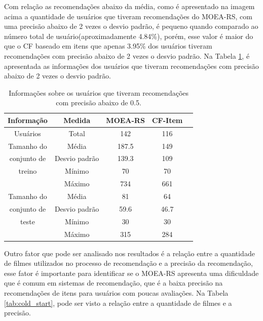 Com relação as recomendações abaixo da média, como é apresentado na imagem acima a quantidade de usuários que tiveram recomendações do MOEA-RS, com uma precisão abaixo de 2 vezes o desvio padrão, é  pequeno quando comparado ao número total de usuário(aproximadamente 4.84\%), porém, esse valor é maior do que o CF baseado em itens que apenas 3.95\% dos usuários tiveram recomendações com precisão abaixo de 2 vezes o desvio padrão.  Na Tabela \ref{tab:low_precisions}, é apresentada as informações dos usuários que tiveram recomendações com precisão abaixo de 2 vezes o desvio padrão.

\begin{table}[H]
\centering
\begin{tabular}{|c| c | c c c |}
\hline
Informação      & Medida           & MOEA-RS    & CF-Item \\ 
\hline
Usuários        & Total             & 142       & 116\\
\hline
Tamanho do      & Média             & 187.5     & 149\\
conjunto de     & Desvio padrão     & 139.3     & 109\\
treino          & Mínimo            & 70        & 70\\
                & Máximo            & 734       & 661\\
\hline
Tamanho do      & Média             & 81        & 64\\
conjunto de     & Desvio padrão     & 59.6      & 46.7\\
teste           & Mínimo            & 30        & 30\\
                & Máximo            & 315       & 284\\
\hline
\end{tabular}
\caption{Informações sobre os usuários que tiveram recomendações com precisão abaixo de 0.5.}
\label{tab:low_precisions}
\end{table}

Outro fator que pode ser analisado nos resultados é a relação entre a quantidade de filmes utilizados no processo de recomendação e a precisão da recomendação, esse fator é importante para identificar se o MOEA-RS apresenta uma dificuldade que é comum em sistemas de recomendação, que é a baixa precisão na recomendações de itens para usuários com poucas avaliações. Na Tabela \ref{tab:cold_start}, pode ser visto a relação entre a quantidade de filmes e a precisão.



